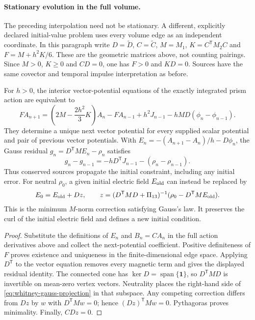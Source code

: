 \paragraph{Stationary evolution in the full volume.}
The preceding interpolation need not be stationary. A different, explicitly
declared initial-value problem uses every volume edge as an independent
coordinate. In this paragraph write \(D=\widetilde D\),
\(C=\widetilde C\), \(M=M_1\), \(K=C^{\mathsf T}M_2C\) and
\(F=M+h^2K/6\). These are the geometric matrices above, not counting
pairings. Since \(M>0\), \(K\geq0\) and \(CD=0\), one has
\(F>0\) and \(KD=0\). Sources have the same covector and temporal
impulse interpretation as before.

\begin{theorem}
\label{thm:whitney-volume-dynamics}
For \(h>0\), the interior vector-potential equations of the exactly
integrated prism action are equivalent to
\begin{equation}
 F A_{n+1}=\left(2M-\frac{2h^2}{3}K\right)A_n-F A_{n-1}
 +h^2J_{n-1}-hMD(\phi_n-\phi_{n-1}).
 \label{eq:whitney-prism-recurrence}
\end{equation}
They determine a unique next vector potential for every supplied scalar
potential and pair of previous vector potentials. With
\(E_n=-(A_{n+1}-A_n)/h-D\phi_n\), the Gauss residual
\(g_n=D^{\mathsf T}ME_n-\rho_n\) satisfies
\[
 g_n-g_{n-1}=-hD^{\mathsf T}J_{n-1}-(\rho_n-\rho_{n-1}).
\]
Thus conserved sources propagate the initial constraint, including any
initial error. For neutral \(\rho_0\), a given initial electric field
\(E_{\rm old}\) can instead be replaced by
\begin{equation}
 E_0=E_{\rm old}+Dz,\qquad
 z=(D^{\mathsf T}MD+\Pi_{13})^{-1}
            (\rho_0-D^{\mathsf T}ME_{\rm old}).
 \label{eq:whitney-gauss-projection}
\end{equation}
This is the minimum \(M\)-norm correction satisfying Gauss's law. It
preserves the curl of the initial electric field and defines a new initial
condition.
\end{theorem}

\begin{proof}
Substitute the definitions of \(E_n\) and \(B_n=CA_n\) in the full
action derivatives above and collect the next-potential coefficient.
Positive definiteness of \(F\) proves existence and uniqueness in the
finite-dimensional edge space. Applying \(D^{\mathsf T}\) to the vector
equation removes every magnetic term and gives the displayed residual
identity. The connected cone has
\(\ker D=\operatorname{span}\{\mathbf1\}\), so
\(D^{\mathsf T}MD\) is invertible on mean-zero vertex vectors.
Neutrality places the right-hand side of
\eqref{eq:whitney-gauss-projection} in that subspace. Any competing
correction differs from \(Dz\) by \(w\) with
\(D^{\mathsf T}Mw=0\); hence \((Dz)^{\mathsf T}Mw=0\).
Pythagoras proves minimality. Finally, \(CDz=0\).
\end{proof}


